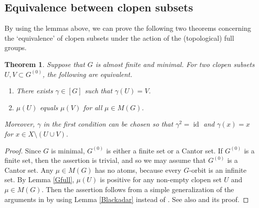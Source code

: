\documentclass[11pt]{article}
\newtheorem{thm}{Theorem}[section]
\theoremstyle{definition}
\newcommand{\id}{\operatorname{id}}
\begin{document}
\subsection{Equivalence between clopen subsets}

By using the lemmas above, 
we can prove the following two theorems 
concerning the `equivalence' of clopen subsets 
under the action of the (topological) full groups. 

\begin{thm}\label{Hopf1}
Suppose that $G$ is almost finite and minimal. 
For two clopen subsets $U,V\subset G^{(0)}$, 
the following are equivalent. 
\begin{enumerate}
\item There exists $\gamma\in[G]$ such that $\gamma(U)=V$. 
\item $\mu(U)$ equals $\mu(V)$ for all $\mu\in M(G)$. 
\end{enumerate}
Moreover, $\gamma$ in the first condition can be chosen so that 
$\gamma^2=\id$ and $\gamma(x)=x$ for $x\in X\setminus(U\cup V)$. 
\end{thm}
\begin{proof}
Since $G$ is minimal, 
$G^{(0)}$ is either a finite set or a Cantor set. 
If $G^{(0)}$ is a finite set, then the assertion is trivial, 
and so we may assume that $G^{(0)}$ is a Cantor set. 
Any $\mu\in M(G)$ has no atoms, 
because every $G$-orbit is an infinite set. 
By Lemma \ref{Gfull}, 
$\mu(U)$ is positive for any non-empty clopen set $U$ and $\mu\in M(G)$. 
Then the assertion follows from 
a simple generalization of the arguments in \cite[Proposition 2.6]{GW} 
by using Lemma \ref{Blackadar} instead of \cite[Lemma 2.5]{GW}. 
See also \cite[Theorem 3.20]{LaO} and its proof. 
\end{proof}
\end{document}
